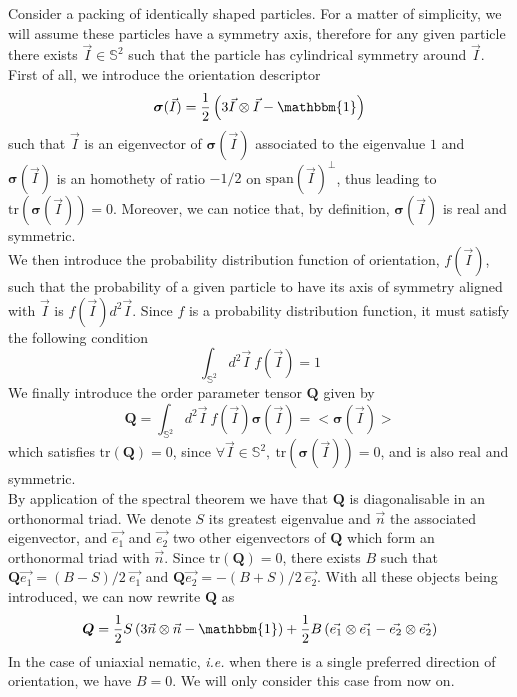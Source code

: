 \documentclass[class=article, float=false, crop=false]{standalone}
\begin{document}
Consider a packing of identically shaped particles. For a matter of simplicity, we will assume these particles have a symmetry axis, therefore for any given particle there exists $\vec{I} \in \mathbb{S}^2$ such that the particle has cylindrical symmetry around $\vec{I}$. First of all, we introduce the orientation descriptor
\begin{equation}
\bm{\sigma}(\vec{I}) = \frac{1}{2}\left(3\vec{I}\otimes\vec{I} - \mathbbm{1}\right)
\label{orientation_descriptor}
\end{equation}
such that $\vec{I}$ is an eigenvector of $\bm{\sigma}(\vec{I})$ associated to the eigenvalue $1$ and $\bm{\sigma}(\vec{I})$ is an homothety of ratio $-1/2$ on $\text{span}(\vec{I})^{\perp}$, thus leading to $\text{tr}(\bm{\sigma}(\vec{I})) = 0$. Moreover, we can notice that, by definition, $\bm{\sigma}(\vec{I})$ is real and symmetric.\\

We then introduce the probability distribution function of orientation, $f(\vec{I})$, such that the probability of a given particle to have its axis of symmetry aligned with $\vec{I}$ is $f(\vec{I})d^2\vec{I}$. Since $f$ is a probability distribution function, it must satisfy the following condition
\begin{equation}
\int_{\mathbb{S}^2} d^2\vec{I}~ f(\vec{I}) = 1
\label{normalisation_f}
\end{equation}
We finally introduce the order parameter tensor $\bm{Q}$ given by
\begin{equation}
\bm{Q} = \int_{\mathbb{S}^2} d^2\vec{I}~ f(\vec{I}) \bm{\sigma}(\vec{I}) = <\bm{\sigma}(\vec{I})>
\label{order_parameter_tensor}
\end{equation}
which satisfies $\text{tr}(\bm{Q})=0$, since $\forall \vec{I}\in\mathbb{S}^2,~ \text{tr}(\bm{\sigma}(\vec{I})) = 0$, and is also real and symmetric.\\

By application of the spectral theorem we have that $\bm{Q}$ is diagonalisable in an orthonormal triad. We denote $S$ its greatest eigenvalue and $\vec{n}$ the associated eigenvector, and $\vec{e_1}$ and $\vec{e_2}$ two other eigenvectors of $\bm{Q}$ which form an orthonormal triad with $\vec{n}$. Since $\text{tr}(\bm{Q})=0$, there exists $B$ such that $\bm{Q}\vec{e_1}=(B-S)/2~\vec{e_1}$ and $\bm{Q}\vec{e_2}=-(B+S)/2~\vec{e_2}$. With all these objects being introduced, we can now rewrite $\bm{Q}$ as
\begin{equation}
\bm{Q} = \frac{1}{2}S\left(3\vec{n}\otimes\vec{n} - \mathbbm{1}\right) + \frac{1}{2}B\left(\vec{e_1}\otimes\vec{e_1} - \vec{e_2}\otimes\vec{e_2}\right)
\label{order_parameter_tensor_S}
\end{equation}
In the case of uniaxial nematic, \textit{i.e.} when there is a single preferred direction of orientation, we have $B=0$. \cite{sengupta2013topological} We will only consider this case from now on.\\
\end{document}
